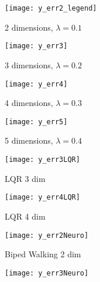 \begin{figure*}[t!]
    \centering
    \begin{subfigure}[b]{0.24\textwidth}
    	\centering
        \texttt{[image: y\_err2\_legend]}
        \vspace{-20pt}\caption{2 dimensions, $\lambda = 0.1$}\label{fig:y_err2}
    \end{subfigure}
    \begin{subfigure}[b]{0.24\textwidth}
    	\centering
        \texttt{[image: y\_err3]}
        \vspace{-20pt}\caption{3 dimensions, $\lambda = 0.2$}\label{fig:y_err3}
    \end{subfigure}
    \begin{subfigure}[b]{0.24\textwidth}
    	\centering
        \vspace{10pt}\texttt{[image: y\_err4]}
        \vspace{-20pt}\caption{4 dimensions, $\lambda = 0.3$}\label{fig:y_err4}
    \end{subfigure}
    \begin{subfigure}[b]{0.24\textwidth}
    	\centering
        \texttt{[image: y\_err5]}
        \vspace{-20pt}\caption{5 dimensions, $\lambda = 0.4$}\label{fig:y_err5}
    \end{subfigure}
    \vspace{0.1in}
    \begin{subfigure}[b]{0.24\textwidth}
        \texttt{[image: y\_err3LQR]}
        \vspace{-20pt}\caption{LQR 3 dim}\label{fig:LQR_3}
    \end{subfigure}
    \begin{subfigure}[b]{0.24\textwidth}
    	\centering
        \texttt{[image: y\_err4LQR]}
        \vspace{-20pt}\caption{LQR 4 dim}\label{fig:LQR_4}
    \end{subfigure}
    \begin{subfigure}[b]{0.24\textwidth}
    	\centering
        \texttt{[image: y\_err2Neuro]}
        \vspace{-20pt}\caption{Biped Walking  2 dim}\label{fig:Neuro_2}
    \end{subfigure}
    \begin{subfigure}[b]{0.24\textwidth}
    	\centering
        \texttt{[image: y\_err3Neuro]}

\end{subfigure}
\end{figure*}
